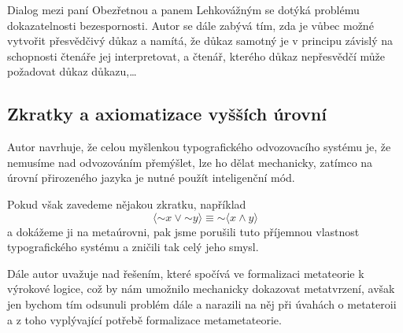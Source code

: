 \documentclass[12pt]{article}
\newcommand{\vnot}[1]{\ensuremath{{\sim}#1}}
\begin{document}
Dialog mezi paní Obezřetnou a panem Lehkovážným se dotýká problému
dokazatelnosti bezespornosti. Autor se dále zabývá tím, zda je vůbec
možné vytvořit přesvědčivý důkaz a namítá, že důkaz samotný
je v principu závislý na schopnosti čtenáře jej interpretovat,
a čtenář, kterého důkaz nepřesvědčí může požadovat důkaz důkazu,…

\subsection{Zkratky a axiomatizace vyšších úrovní}

Autor navrhuje, že celou myšlenkou typografického odvozovacího systému
je, že nemusíme nad odvozováním přemýšlet, lze ho dělat mechanicky, zatímco
na úrovní přirozeného jazyka je nutné použít inteligenční mód.

Pokud však zavedeme nějakou zkratku, například
$$\langle \vnot{x} \lor \vnot{y} \rangle \equiv \vnot{\langle x \land y \rangle}$$
a dokážeme ji na metaúrovni, pak jsme porušili tuto příjemnou
vlastnost typografického systému a zničili tak celý jeho smysl.

\bigskip
Dále autor uvažuje nad řešením, které spočívá ve formalizaci metateorie
k výrokové logice, což by nám umožnilo mechanicky dokazovat metatvrzení,
avšak jen bychom tím odsunuli problém dále a narazili na něj při úvahách
o metateroii a z toho vyplývající potřebě formalizace metametateorie.
\end{document}
